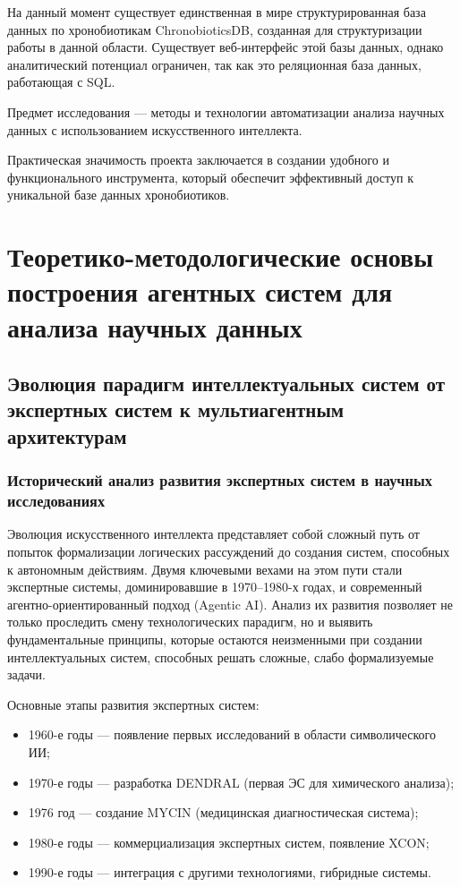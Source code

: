 \documentclass{syksu-coursework}
\begin{document}
На данный момент существует единственная в мире структурированная база данных по хронобиотикам ChronobioticsDB, созданная для структуризации работы в данной области. Существует веб-интерфейс этой базы данных, однако аналитический потенциал ограничен, так как это реляционная база данных, работающая с SQL.

Предмет исследования --- методы и технологии автоматизации анализа научных данных с использованием искусственного интеллекта.

Практическая значимость проекта заключается в создании удобного и функционального инструмента, который обеспечит эффективный доступ к уникальной базе данных хронобиотиков.

\newpage

\section{Теоретико-методологические основы построения агентных систем для анализа научных данных}

\subsection{Эволюция парадигм интеллектуальных систем от экспертных систем к мультиагентным архитектурам}

\subsubsection{Исторический анализ развития экспертных систем в научных исследованиях}

Эволюция искусственного интеллекта представляет собой сложный путь от попыток формализации логических рассуждений до создания систем, способных к автономным действиям. Двумя ключевыми вехами на этом пути стали экспертные системы, доминировавшие в 1970–1980-х годах, и современный агентно-ориентированный подход (Agentic AI). Анализ их развития позволяет не только проследить смену технологических парадигм, но и выявить фундаментальные принципы, которые остаются неизменными при создании интеллектуальных систем, способных решать сложные, слабо формализуемые задачи.

Основные этапы развития экспертных систем:

\begin{itemize}
    \item 1960-е годы — появление первых исследований в области символического ИИ;
    \item 1970-е годы — разработка DENDRAL (первая ЭС для химического анализа);
    \item 1976 год — создание MYCIN (медицинская диагностическая система);
    \item 1980-е годы — коммерциализация экспертных систем, появление XCON;
    \item 1990-е годы — интеграция с другими технологиями, гибридные системы.
\end{itemize}
\end{document}
